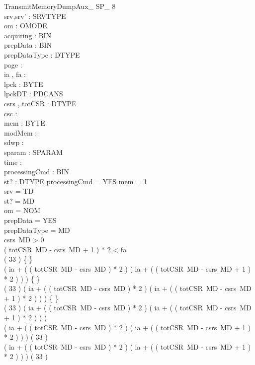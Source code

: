 \begin{schema}{TransmitMemoryDumpAux\_ SP\_ 8}\\
 srv,srv' : SRVTYPE \\
 om : OMODE \\
 acquiring : BIN \\
 prepData : BIN \\
 prepDataType : DTYPE \\
 page : \nat \\
 ia , fa : \nat \\
 lpck : \seq BYTE \\
 lpckDT : PDCANS \\
 csrs , totCSR : DTYPE \fun \nat \\
 csc : \nat \\
 mem : \nat \pfun BYTE \\
 modMem : \power \nat \\
 sdwp : \nat \\
 sparam : SPARAM \fun \nat \\
 time : \nat \\
 processingCmd : BIN \\
 st? : DTYPE 
\where
 processingCmd = YES \land \dom mem = 1  \\
 srv = TD \\
 st? = MD \\
 om = NOM \\
 prepData = YES \\
 prepDataType = MD \\
 csrs~MD > 0 \\
 ( totCSR~MD - csrs~MD + 1 ) * 2 < fa \\
 ( 33  ) \neq \{ \} \\
 ( ia + ( ( totCSR~MD - csrs~MD ) * 2 ) \upto ( ia + ( ( totCSR~MD - csrs~MD + 1 ) * 2 ) ) ) \neq \{ \} \\
 ( 33  ) \cap ( ia + ( ( totCSR~MD - csrs~MD ) * 2 ) \upto ( ia + ( ( totCSR~MD - csrs~MD + 1 ) * 2 ) ) ) \neq \{ \} \\
 \lnot ( 33  ) \subseteq ( ia + ( ( totCSR~MD - csrs~MD ) * 2 ) \upto ( ia + ( ( totCSR~MD - csrs~MD + 1 ) * 2 ) ) ) \\
 \lnot ( ia + ( ( totCSR~MD - csrs~MD ) * 2 ) \upto ( ia + ( ( totCSR~MD - csrs~MD + 1 ) * 2 ) ) ) \subseteq ( 33  ) \\
 ( ia + ( ( totCSR~MD - csrs~MD ) * 2 ) \upto ( ia + ( ( totCSR~MD - csrs~MD + 1 ) * 2 ) ) ) \neq ( 33  )
\end{schema}

